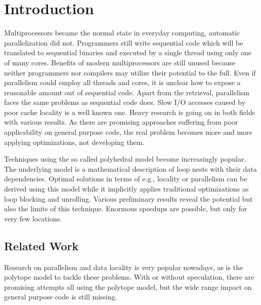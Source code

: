 
\chapter{Introduction} %
\label{Chapter1}


Multiprocessors became the normal state in everyday computing, automatic
parallelization did not. Programmers still write sequential code which will be
translated to sequential binaries and executed by a single thread using only
one of many cores. %
Benefits of modern multiprocessors are still unused because neither programmers 
nor compilers may utilize their potential to the full. Even if parallelism could
employ all threads and cores, it is unclear how to expose a reasonable  
amount out of sequential code.
Apart from the retrieval, parallelism faces the same problems as sequential
code does. Slow I/O accesses caused by poor cache locality is a well known one. 
Heavy research is going on in both fields with various results. 
As there are promising approaches suffering from poor applicability on general 
purpose code, the real problem becomes more and more applying optimizations, not
developing them. 


Techniques using the so called polyhedral model become increasingly popular.
The underlying model is a mathematical description of loop nests with 
their data dependencies. Optimal solutions in terms of e.g., locality or 
parallelism can be derived using this model while it implicitly applies 
traditional optimizations as loop blocking and unrolling. 
Various preliminary results reveal the potential but also the
limits of this technique. Enormous speedups are possible, 
but only for very few locations.



\section{Related Work}
Research on parallelism and data locality is very popular nowadays, as is the 
polytope model to tackle these problems. With or without speculation, there are
promising attempts all using the polytope model, but the wide range 
impact on general purpose code is still missing.

